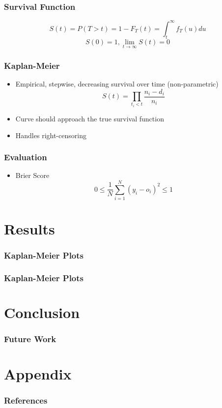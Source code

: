 \documentclass[serif,final,bigger]{beamer}
\begin{document}
  \begin{frame}
    \frametitle{Survival Function}
    $$S(t) = P(T > t) = 1 - F_T(t) = \int_t^\infty f_T(u) du$$
    $$S(0) = 1, \lim_{t \to \infty} S(t) = 0$$
  \end{frame}

  \begin{frame}
    \frametitle{Kaplan-Meier}
    \begin{itemize}
      \item Empirical, stepwise, decreasing survival over time (non-parametric)
      $$S(t) = \prod_{t_i < t} \frac{n_i - d_i}{n_i}$$
      \item Curve should approach the true survival function
      \item Handles right-censoring
    \end{itemize}
  \end{frame}

  \begin{frame}
    \frametitle{Evaluation}
    \begin{itemize}
      \item Brier Score
      $$0 \leq \frac{1}{N} \sum_{i=1}^N (y_i - o_i)^2 \leq 1$$
    \end{itemize}
  \end{frame}

  \section{Results}


  \begin{frame}
    \frametitle{Kaplan-Meier Plots}
    
  \end{frame}

  \begin{frame}
    \frametitle{Kaplan-Meier Plots}
    
  \end{frame}

  \section{Conclusion}

  \begin{frame}
    \frametitle{Future Work}
  \end{frame}

  \section{Appendix}

  \begin{frame}
    \frametitle{References}
  \end{frame}
\end{document}

